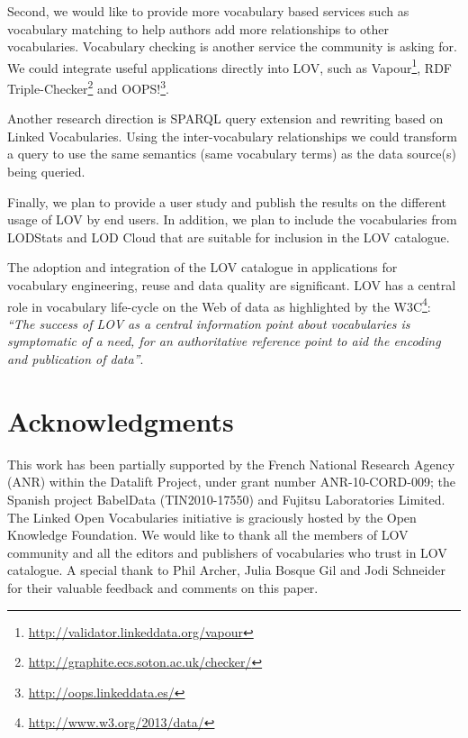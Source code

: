 \documentclass{iosart2c}
\begin{document}
Second, we would like to provide more vocabulary based services such as vocabulary matching to help authors add more relationships to other vocabularies. Vocabulary checking is another service the community is asking for. We could integrate useful applications directly into LOV, such as Vapour\footnote{\url{http://validator.linkeddata.org/vapour}}, RDF Triple-Checker\footnote{\url{http://graphite.ecs.soton.ac.uk/checker/}} and OOPS!\footnote{\url{http://oops.linkeddata.es/}}. 

Another research direction is SPARQL query extension and rewriting based on Linked Vocabularies. Using the inter-vocabulary relationships we could transform a query to use the same semantics (same vocabulary terms) as the data source(s) being queried.

Finally, we plan to provide a user study and publish the results on the different usage of LOV by end users. In addition, we plan to include the vocabularies from LODStats and LOD Cloud that are suitable for inclusion in the LOV catalogue.

The adoption and integration of the LOV catalogue in applications for vocabulary engineering, reuse and data quality are significant.
LOV has a central role in vocabulary life-cycle on the Web of data as highlighted by the W3C\footnote{\url{http://www.w3.org/2013/data/}}: \textit{``The success of LOV as a central information point about vocabularies is symptomatic of a need, for an authoritative reference point to aid the encoding and publication of data''}.


\section*{Acknowledgments}
This work has been partially supported by the French National Research Agency (ANR) within the Datalift Project, under grant number ANR-10-CORD-009; the Spanish project BabelData (TIN2010-17550) and Fujitsu Laboratories Limited. The Linked Open Vocabularies initiative is graciously hosted by the Open Knowledge Foundation. We would like to thank all the members of LOV community and all the editors and publishers of vocabularies who trust in LOV catalogue. A special thank to Phil Archer, Julia Bosque Gil and Jodi Schneider for their valuable feedback and comments on this paper.



\end{document}
